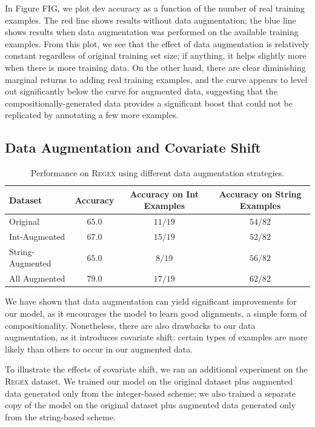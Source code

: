 \documentclass[11pt,letterpaper]{article}
\newcommand{\regex}{\textsc{Regex}\xspace}
\begin{document}
In Figure FIG, we plot dev accuracy as a function of
the number of real training examples.  The red line
shows results without data augmentation;
the blue line shows results when data augmentation was 
performed on the available training examples.
From this plot, we see that the effect of 
data augmentation is relatively constant regardless
of original training set size; if anything,
it helps slightly more when there is more training data.
On the other hand, there are clear diminishing marginal returns
to adding real training examples, and the curve appears to level out
significantly below the curve for augmented data,
suggesting that the compositionally-generated data
provides a significant boost that could not be replicated
by annotating a few more examples.

\subsection{Data Augmentation and Covariate Shift}
\begin{table}[t]
  \centering
  \small
  \begin{tabular}{|l|c|c|c|}
    \hline
    Dataset & Accuracy & Accuracy on Int Examples & Accuracy on String Examples \\
    \hline
    Original & $65.0$ & $11/19$ & $54/82$ \\
    Int-Augmented & $67.0$ & $15/19$ & $52/82$ \\
    String-Augmented & $65.0$ & $8/19$ & $56/82$\\
    All Augmented & $79.0$ & $17/19$ & $62/82$ \\
    \hline
  \end{tabular}
  \caption{Performance on \regex using different data augmentation strategies.}
  \label{tab:regex-shift}
\end{table}

We have shown that data augmentation can yield significant improvements
for our model, as it encourages the model to learn good alignments,
a simple form of compositionality.  Nonetheless,
there are also drawbacks to our data augmentation, as it introduces
covariate shift: certain types of examples are more likely than others
to occur in our augmented data.

To illustrate the effects of covariate shift, we ran an additional
experiment on the \regex dataset.  We trained our model
on the original dataset plus augmented data generated only from the
integer-based scheme; we also trained a separate copy of the model
on the original dataset plus augmented data generated only from the
string-based scheme.  
\end{document}
